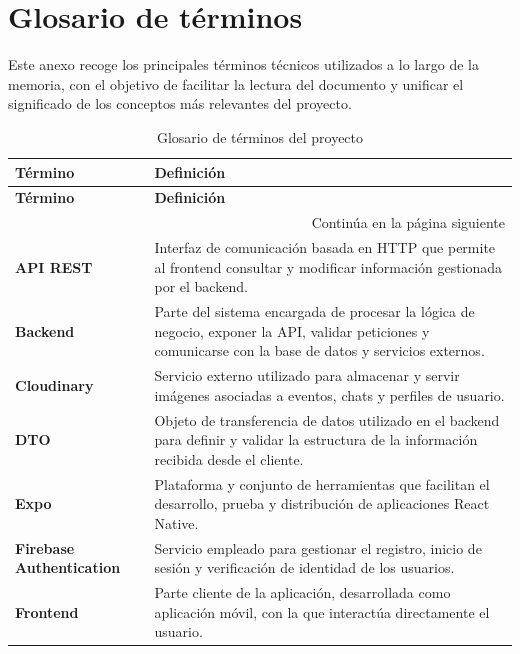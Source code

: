 \chapter{Glosario de términos}

Este anexo recoge los principales términos técnicos utilizados a lo largo de la memoria, con el objetivo de facilitar la lectura del documento y unificar el significado de los conceptos más relevantes del proyecto.

\begin{longtable}{p{}p{}}
\caption{Glosario de términos del proyecto}\label{tab:glosario}\\
\toprule
\textbf{Término} & \textbf{Definición} \\
\midrule
\endfirsthead

\toprule
\textbf{Término} & \textbf{Definición} \\
\midrule
\endhead

\midrule
\multicolumn{2}{r}{Continúa en la página siguiente} \\
\endfoot

\bottomrule
\endlastfoot

\textbf{API REST} & Interfaz de comunicación basada en HTTP que permite al frontend consultar y modificar información gestionada por el backend. \\

\textbf{Backend} & Parte del sistema encargada de procesar la lógica de negocio, exponer la API, validar peticiones y comunicarse con la base de datos y servicios externos. \\

\textbf{Cloudinary} & Servicio externo utilizado para almacenar y servir imágenes asociadas a eventos, chats y perfiles de usuario. \\

\textbf{DTO} & Objeto de transferencia de datos utilizado en el backend para definir y validar la estructura de la información recibida desde el cliente. \\

\textbf{Expo} & Plataforma y conjunto de herramientas que facilitan el desarrollo, prueba y distribución de aplicaciones React Native. \\

\textbf{Firebase Authentication} & Servicio empleado para gestionar el registro, inicio de sesión y verificación de identidad de los usuarios. \\

\textbf{Frontend} & Parte cliente de la aplicación, desarrollada como aplicación móvil, con la que interactúa directamente el usuario. \\


\end{longtable}
